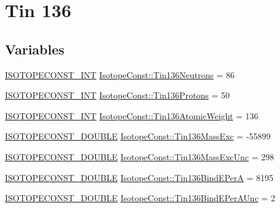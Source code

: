\hypertarget{group___isotope_const-_tin-_sn136}{}\section{Tin 136}
\label{group___isotope_const-_tin-_sn136}
\subsection*{Variables}
\begin{DoxyCompactItemize}
\item 
\mbox{\hyperlink{group___isotope_const-_macros_ga5f18360b3e99483a35c32d789e62621c}{I\+S\+O\+T\+O\+P\+E\+C\+O\+N\+S\+T\+\_\+\+I\+NT}} \mbox{\hyperlink{group___isotope_const-_tin-_sn136_ga0054a4d173a42905f9173de54dd39f33}{Isotope\+Const\+::\+Tin136\+Neutrons}} = 86
\item 
\mbox{\hyperlink{group___isotope_const-_macros_ga5f18360b3e99483a35c32d789e62621c}{I\+S\+O\+T\+O\+P\+E\+C\+O\+N\+S\+T\+\_\+\+I\+NT}} \mbox{\hyperlink{group___isotope_const-_tin-_sn136_ga804b5eb8e88b5831a0e538ea6876e855}{Isotope\+Const\+::\+Tin136\+Protons}} = 50
\item 
\mbox{\hyperlink{group___isotope_const-_macros_ga5f18360b3e99483a35c32d789e62621c}{I\+S\+O\+T\+O\+P\+E\+C\+O\+N\+S\+T\+\_\+\+I\+NT}} \mbox{\hyperlink{group___isotope_const-_tin-_sn136_ga5992d548df5ea0e796a270260b3acaac}{Isotope\+Const\+::\+Tin136\+Atomic\+Weight}} = 136
\item 
\mbox{\hyperlink{group___isotope_const-_macros_ga8f45a7272ce02c0b4c65c44636ed719a}{I\+S\+O\+T\+O\+P\+E\+C\+O\+N\+S\+T\+\_\+\+D\+O\+U\+B\+LE}} \mbox{\hyperlink{group___isotope_const-_tin-_sn136_ga808798fbedad26c28c7549521e379cb9}{Isotope\+Const\+::\+Tin136\+Mass\+Exc}} = -\/55899
\item 
\mbox{\hyperlink{group___isotope_const-_macros_ga8f45a7272ce02c0b4c65c44636ed719a}{I\+S\+O\+T\+O\+P\+E\+C\+O\+N\+S\+T\+\_\+\+D\+O\+U\+B\+LE}} \mbox{\hyperlink{group___isotope_const-_tin-_sn136_gae5633a5a4d4355917f41240e880784a0}{Isotope\+Const\+::\+Tin136\+Mass\+Exc\+Unc}} = 298
\item 
\mbox{\hyperlink{group___isotope_const-_macros_ga8f45a7272ce02c0b4c65c44636ed719a}{I\+S\+O\+T\+O\+P\+E\+C\+O\+N\+S\+T\+\_\+\+D\+O\+U\+B\+LE}} \mbox{\hyperlink{group___isotope_const-_tin-_sn136_ga0e871cbb019d5570de5da0f4fbb5dc50}{Isotope\+Const\+::\+Tin136\+Bind\+E\+PerA}} = 8195
\item 
\mbox{\hyperlink{group___isotope_const-_macros_ga8f45a7272ce02c0b4c65c44636ed719a}{I\+S\+O\+T\+O\+P\+E\+C\+O\+N\+S\+T\+\_\+\+D\+O\+U\+B\+LE}} \mbox{\hyperlink{group___isotope_const-_tin-_sn136_gac07247d76fe2ebca9b6666582ecc408b}{Isotope\+Const\+::\+Tin136\+Bind\+E\+Per\+A\+Unc}} = 2

\end{DoxyCompactItemize}
